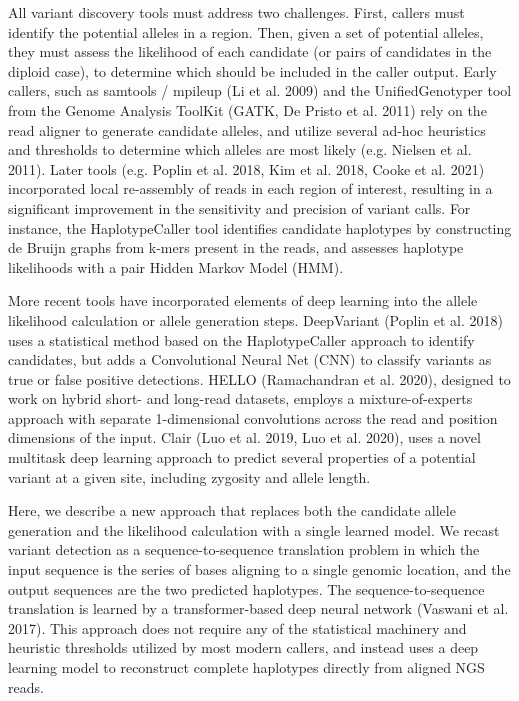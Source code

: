 \documentclass[]{article}
\begin{document}
All variant discovery tools must address two challenges. First, callers must identify the potential alleles in a region. Then, given a set of potential alleles, they must assess the likelihood of each candidate (or pairs of candidates in the diploid case), to determine which should be included in the caller output. Early callers, such as samtools / mpileup (Li et al. 2009) and the UnifiedGenotyper tool from the Genome Analysis ToolKit (GATK, De Pristo et al. 2011) rely on the read aligner to generate candidate alleles, and utilize several ad-hoc heuristics and thresholds to determine which alleles are most likely (e.g. Nielsen et al. 2011). Later tools (e.g. Poplin et al. 2018, Kim et al. 2018, Cooke et al. 2021) incorporated local re-assembly of reads in each region of interest, resulting in a significant improvement in the sensitivity and precision of variant calls. For instance, the HaplotypeCaller tool identifies candidate haplotypes by constructing de Bruijn graphs from k-mers present in the reads, and assesses haplotype likelihoods with a pair Hidden Markov Model (HMM). 

More recent tools have incorporated elements of deep learning into the allele likelihood calculation or allele generation steps. DeepVariant (Poplin et al. 2018) uses a statistical method based on the HaplotypeCaller approach to identify candidates, but adds a Convolutional Neural Net (CNN) to classify variants as true or false positive detections. HELLO (Ramachandran et al. 2020), designed to work on hybrid short- and long-read datasets, employs a mixture-of-experts approach with separate 1-dimensional convolutions across the read and position dimensions of the input. Clair (Luo et al. 2019, Luo et al. 2020), uses a novel multitask deep learning approach to predict several properties of a potential variant at a given site, including zygosity and allele length. 

Here, we describe a new approach that replaces both the candidate allele generation and the likelihood calculation with a single learned model. We recast variant detection as a sequence-to-sequence translation problem in which the input sequence is the series of bases aligning to a single genomic location, and the output sequences are the two predicted haplotypes. The sequence-to-sequence translation is learned by a transformer-based deep neural network (Vaswani et al. 2017). This approach does not require any of the statistical machinery and heuristic thresholds utilized by most modern callers, and instead uses a deep learning model to reconstruct complete haplotypes directly from aligned NGS reads. 
\end{document}
